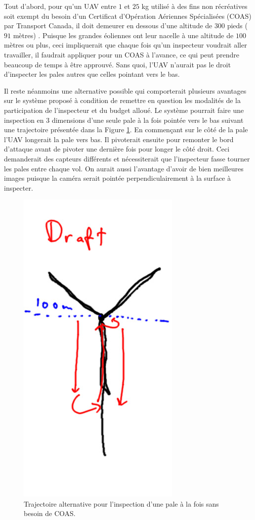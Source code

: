 Tout d'abord, pour qu'un UAV entre $1$ et $25$ kg utilisé à des fins non récréatives soit exempt du besoin d'un Certificat d'Opération Aériennes Spécialisées (COAS) par Transport Canada, il doit demeurer en dessous d'une altitude de $300$ pieds ($91$ mètres) \citep{transportscanada2016}. Puisque les grandes éoliennes ont leur nacelle à une altitude de $100$ mètres ou plus, ceci impliquerait que chaque fois qu'un inspecteur voudrait aller travailler, il faudrait appliquer pour un COAS à l'avance, ce qui peut prendre beaucoup de temps à être approuvé. Sans quoi, l'UAV n'aurait pas le droit d'inspecter les pales autres que celles pointant vers le bas.

Il reste néanmoins une alternative possible qui comporterait plusieurs avantages sur le système proposé à condition de remettre en question les modalités de la participation de l'inspecteur et du budget alloué. Le système pourrait faire une inspection en 3 dimensions d'une seule pale à la fois pointée vers le bas suivant une trajectoire présentée dans la Figure \ref{fig:alternative}. En commençant sur le côté de la pale l'UAV longerait la pale vers bas. Il pivoterait ensuite pour remonter le bord d'attaque avant de pivoter une dernière fois pour longer le côté droit. Ceci demanderait des capteurs différents et nécessiterait que l'inspecteur fasse tourner les pales entre chaque vol. On aurait aussi l'avantage d'avoir de bien meilleures images puisque la caméra serait pointée perpendiculairement à la surface à inspecter.

\begin{figure}[htb]
  \centering
  \includegraphics[width=0.3\linewidth]{images/cool_alternative.jpg}
  \caption{Trajectoire alternative pour l'inspection d'une pale à la fois sans besoin de COAS.}
  \label{fig:alternative}
\end{figure}

